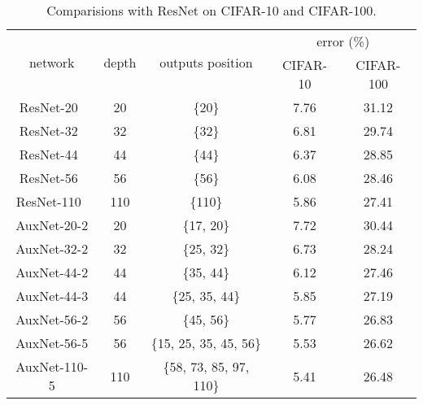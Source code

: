 \documentclass[10pt,onecolumn,letterpaper]{article}
\def\SexyName{AuxNet\xspace}
\begin{document}
\begin{table}[t]
  \centering
  \caption{Comparisions with ResNet on CIFAR-10 and CIFAR-100.}
    \begin{tabular}{c|c|c|c|c}
    \hline
    \multirow{2}[0]{*}{network} & \multirow{2}[0]{*}{depth} & \multirow{2}[0]{*}{outputs position} & \multicolumn{2}{c}{error (\%)} \\
    \cline{4-5}
        &   &   & CIFAR-10 & CIFAR-100 \\
    \hline
    ResNet-20~\cite{he2016identity} & 20    & \{20\}  & 7.76 & 31.12 \\
    ResNet-32~\cite{he2016identity} & 32    & \{32\}  & 6.81 & 29.74 \\
    ResNet-44~\cite{he2016identity} & 44    & \{44\}  & 6.37 & 28.85 \\
    ResNet-56~\cite{he2016identity} & 56    & \{56\}  & 6.08 & 28.46 \\
    ResNet-110~\cite{he2016identity} & 110   & \{110\} & 5.86 & 27.41 \\
    \hline
    \SexyName-20-2 & 20    & \{17, 20\} & 7.72 & 30.44 \\
    \SexyName-32-2 & 32    & \{25, 32\} & 6.73 & 28.24 \\
    \SexyName-44-2 & 44    & \{35, 44\} & 6.12 & 27.46 \\
    \SexyName-44-3 & 44    & \{25, 35, 44\} & 5.85 & 27.19 \\
    \SexyName-56-2 & 56    & \{45, 56\} & 5.77 & 26.83 \\
    \SexyName-56-5 & 56    & \{15, 25, 35, 45, 56\} & 5.53 & 26.62 \\
    \SexyName-110-5 & 110   & \{58, 73, 85, 97, 110\}   &   5.41    &  26.48 \\
    \hline
    \end{tabular}
  \label{tab:cifar-resnet}%
\end{table}
\end{document}
